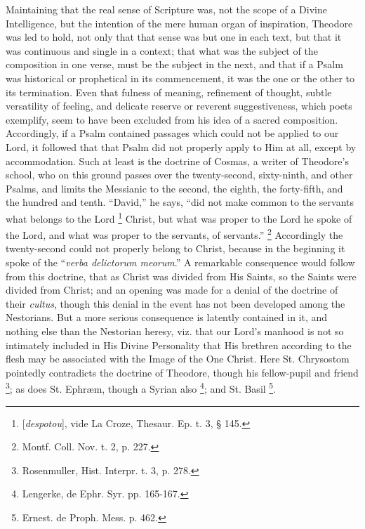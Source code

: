 Maintaining that the real sense of Scripture was, not the scope of
a Divine Intelligence, but the intention of the mere human organ of
inspiration, Theodore was led to hold, not only that that sense was
but one in each text, but that it was continuous and single in a
context; that what was the subject of the composition in one verse,
must be the subject in the next, and that if a Psalm was historical or
prophetical in its commencement, it was the one or the other to its
termination. Even that fulness of meaning, refinement of thought,
subtle versatility of feeling, and delicate reserve or reverent
suggestiveness, which poets exemplify, seem to have been excluded from
his idea of a sacred composition. Accordingly, if a Psalm contained
passages which could not be applied to our Lord, it followed that that
Psalm did not properly apply to Him at all, except by accommodation.
Such at least is the doctrine of Cosmas, a writer of Theodore's
school, who on this ground passes over the twenty-second, sixty-ninth,
and other Psalms, and limits the Messianic to the second, the eighth,
the forty-fifth, and the hundred and tenth. ``David,'' he
says, ``did not make common to the servants what belongs to the
Lord \footnote{[\emph{despotou}], vide La Croze, Thesaur.
Ep. t. 3, § 145.} Christ, but what was
proper to the Lord he spoke of the Lord, and what was proper to
the servants, of servants.'' \footnote{Montf. Coll. Nov. t. 2, p. 227.} Accordingly the twenty-second could not properly belong to
Christ, because in the beginning it spoke of the ``\emph{verba
delictorum meorum}.'' A remarkable consequence would follow
from this doctrine, that as Christ was divided from His Saints, so the
Saints were divided from Christ; and an opening was made for a denial
of the doctrine of their \emph{cultus}, though this denial in the
event has not been developed among the Nestorians. But a more serious
consequence is latently contained in it, and nothing else than the
Nestorian heresy, viz. that our Lord's manhood is not so intimately
included in His Divine Personality that His brethren according to the
flesh may be associated with the Image of the One Christ. Here St.
Chrysostom pointedly contradicts the doctrine of Theodore, though his
fellow-pupil and friend \footnote{Rosenmuller, Hist. Interpr. t. 3, p. 278.};
as does St. Ephræm, though a Syrian also \footnote{Lengerke, de Ephr. Syr. pp. 165-167.}; and St. Basil \footnote{Ernest. de Proph. Mess. p. 462.}.

